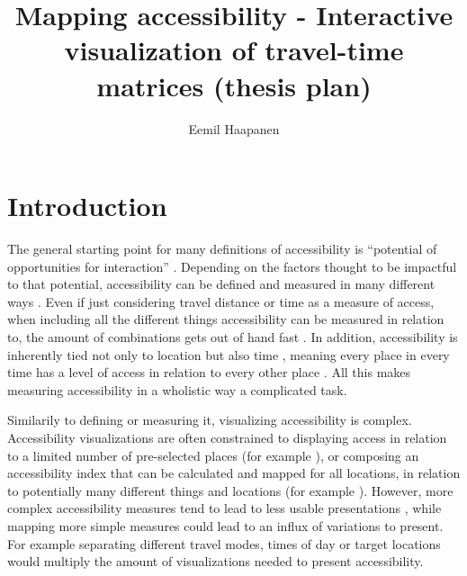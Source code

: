 \documentclass[12pt]{article}
\title{Mapping accessibility - Interactive visualization of travel-time matrices (thesis plan)}
\author{Eemil Haapanen}
\begin{document}
\maketitle

\section{Introduction}
The general starting point for many definitions of accessibility is
\enquote{potential of opportunities for interaction} \parencite{han1959}.
Depending on the factors thought to be impactful to that potential,
accessibility can be defined and measured in many different ways \parencite{pap2016}.
Even if just considering travel distance or time as a measure of access,
when including all the different things accessibility can be measured in relation to,
the amount of combinations gets out of hand fast \parencite{lev2020}.
In addition, accessibility is inherently tied not only to location
but also time \parencite{jar2018},
meaning every place in every time has a level of access
in relation to every other place \parencite{lev2020}.
All this makes measuring accessibility in a wholistic way a complicated task.

Similarily to defining or measuring it, visualizing accessibility is complex.
Accessibility visualizations are often constrained to displaying access in relation to
a limited number of pre-selected places (for example \textcite{wei2018}),
or composing an accessibility index that can be calculated and mapped for all locations,
in relation to potentially many different things and locations (for example \textcite{kim2019}).
However, more complex accessibility measures tend to lead to
less usable presentations \parencite{te2014},
while mapping more simple measures could lead to an influx of variations to present.
For example separating different travel modes, times of day or target locations
would multiply the amount of visualizations needed to present accessibility.
\end{document}
